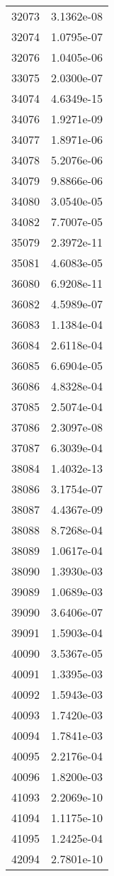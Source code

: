 \begin{table}[h!]
\begin{tabular}{|| c || c |}
32073 & 3.1362e-08 \\
32074 & 1.0795e-07 \\
32076 & 1.0405e-06 \\
33075 & 2.0300e-07 \\
34074 & 4.6349e-15 \\
34076 & 1.9271e-09 \\
34077 & 1.8971e-06 \\
34078 & 5.2076e-06 \\
34079 & 9.8866e-06 \\
34080 & 3.0540e-05 \\
34082 & 7.7007e-05 \\
35079 & 2.3972e-11 \\
35081 & 4.6083e-05 \\
36080 & 6.9208e-11 \\
36082 & 4.5989e-07 \\
36083 & 1.1384e-04 \\
36084 & 2.6118e-04 \\
36085 & 6.6904e-05 \\
36086 & 4.8328e-04 \\
37085 & 2.5074e-04 \\
37086 & 2.3097e-08 \\
37087 & 6.3039e-04 \\
38084 & 1.4032e-13 \\
38086 & 3.1754e-07 \\
38087 & 4.4367e-09 \\
38088 & 8.7268e-04 \\
38089 & 1.0617e-04 \\
38090 & 1.3930e-03 \\
39089 & 1.0689e-03 \\
39090 & 3.6406e-07 \\
39091 & 1.5903e-04 \\
40090 & 3.5367e-05 \\
40091 & 1.3395e-03 \\
40092 & 1.5943e-03 \\
40093 & 1.7420e-03 \\
40094 & 1.7841e-03 \\
40095 & 2.2176e-04 \\
40096 & 1.8200e-03 \\
41093 & 2.2069e-10 \\
41094 & 1.1175e-10 \\
41095 & 1.2425e-04 \\
42094 & 2.7801e-10 \\

\end{tabular}
\end{table}
